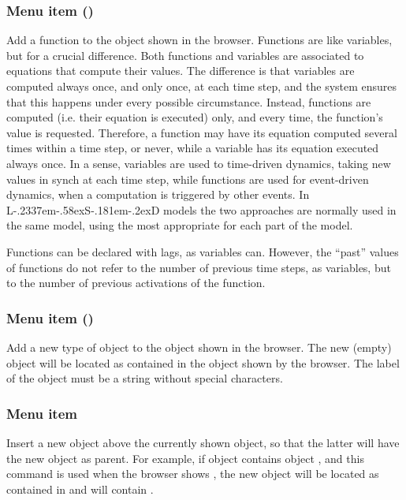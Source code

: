 \documentclass [11pt,a4paper] {book}
\def\LsD{{L\kern-.2337em\lower-.58ex\hbox{S}\kern-.181em\lower-.2ex\hbox{D}}\xspace}
\begin{document}
\subsubsection{Menu item  ()}

Add a function to the object shown in the browser. Functions are like variables, but for a crucial difference. Both functions and variables are associated to equations that compute their values. The difference is that variables are computed always once, and only once, at each time step, and the system ensures that this happens under every possible circumstance. Instead, functions are computed (i.e. their equation is executed) only, and every time, the function's value is requested. Therefore, a function may have its equation computed several times within a time step, or never, while a variable has its equation executed always once. In a sense, variables are used to time-driven dynamics, taking new values in synch at each time step, while functions are used for event-driven dynamics, when a computation is triggered by other events. In \LsD models the two approaches are normally used in the same model, using the most appropriate for each part of the model.

Functions can be declared with lags, as variables can. However, the ``past'' values of functions do not refer to the number of previous time steps, as variables, but to the number of previous activations of the function.

\subsubsection{Menu item  ()}

Add a new type of object to the object shown in the browser. The new (empty) object will be located as contained in the object shown by the browser. The label of the object must be a string without special characters.

\subsubsection{Menu item  }

Insert a new object above the currently shown object, so that the latter will have the new object as parent. For example, if object  contains object , and this command is used when the browser shows , the new object will be located as contained in  and will contain .
\end{document}
